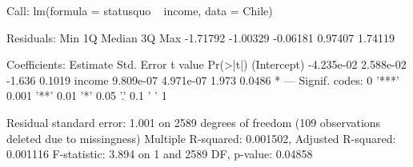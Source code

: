 \begin{Schunk}
\begin{Soutput}
Call:
lm(formula = statusquo ~ income, data = Chile)

Residuals:
     Min       1Q   Median       3Q      Max 
-1.71792 -1.00329 -0.06181  0.97407  1.74119 

Coefficients:
              Estimate Std. Error t value Pr(>|t|)  
(Intercept) -4.235e-02  2.588e-02  -1.636   0.1019  
income       9.809e-07  4.971e-07   1.973   0.0486 *
---
Signif. codes:  0 '***' 0.001 '**' 0.01 '*' 0.05 '.' 0.1 ' ' 1

Residual standard error: 1.001 on 2589 degrees of freedom
  (109 observations deleted due to missingness)
Multiple R-squared:  0.001502,	Adjusted R-squared:  0.001116 
F-statistic: 3.894 on 1 and 2589 DF,  p-value: 0.04858
\end{Soutput}
\end{Schunk}
